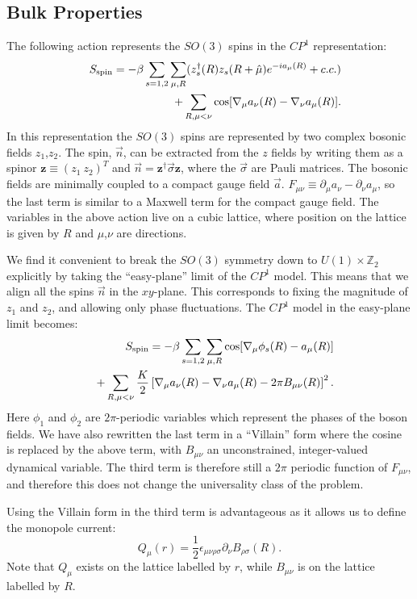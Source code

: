 \documentclass[prb,twocolumn]{revtex4}
\begin{document}
\subsection{Bulk Properties}
The following action represents the $SO(3)$ spins in the $CP^1$ representation:
\begin{eqnarray}
&&S_{\rm spin}=-\beta\sum_{s=1,2}\sum_{\mu,R} (z_s^\dagger(R)z_s(R+\hat\mu)e^{-ia_\mu(R)}+c.c.) \nonumber\\
&&+\sum_{R,\mu<\nu} \cos[\nabla_\mu a_\nu(R)-\nabla_\nu a_\mu(R)].
\end{eqnarray} 
In this representation the $SO(3)$ spins are represented by two complex bosonic fields $z_1$,$z_2$. The spin, $\vec{n}$, can be extracted from the $z$ fields by writing them as a spinor $\mathbf{z}\equiv(z_1~z_2)^T$ and $\vec{n}=\mathbf{z^\dagger} \vec\sigma \mathbf{z}$, where the $\vec{\sigma}$ are Pauli matrices. The bosonic fields are minimally coupled to a compact gauge field $\vec{a}$. $F_{\mu\nu}\equiv \partial_\mu a_\nu-\partial_\nu a_\mu$, so the last term is similar to a Maxwell term for the compact gauge field. The variables in the above action live on a cubic lattice, where position on the lattice is given by $R$ and $\mu$,$\nu$ are directions.

We find it convenient to break the $SO(3)$ symmetry down to $U(1)\times\mathbb{Z}_2$ explicitly by taking the ``easy-plane'' limit of the $CP^1$ model. This means that we align all the spins $\vec{n}$ in the $xy$-plane. This corresponds to fixing the magnitude of $z_1$ and $z_2$, and allowing only phase fluctuations. The $CP^1$ model in the easy-plane limit becomes:
\begin{eqnarray}
&&S_{\rm spin}=-\beta\sum_{s=1,2}\sum_{\mu,R} \cos[\nabla_\mu\phi_s(R)-a_\mu(R)]\nonumber\\
&&+\sum_{R,\mu<\nu}\frac{K}{2}\left[\nabla_\mu a_\nu(R)-\nabla_\nu a_\mu(R)-2\pi B_{\mu\nu}(R)\right]^2.
\label{sspin}
\end{eqnarray}
Here $\phi_1$ and $\phi_2$ are $2\pi$-periodic variables which represent the phases of the boson fields. We have also rewritten the last term in a ``Villain'' form where the cosine is replaced by the above term, with $B_{\mu\nu}$ an unconstrained, integer-valued dynamical variable. The third term is therefore still a $2\pi$ periodic function of $F_{\mu\nu}$, and therefore this does not change the universality class of the problem.

Using the Villain form in the third term is advantageous as it allows us to define the monopole current:
\begin{equation}
Q_\mu(r)=\frac{1}{2}\epsilon_{\mu\nu\rho\sigma}\partial_\nu B_{\rho\sigma}(R).
\end{equation}
Note that $Q_\mu$ exists on the lattice labelled by $r$, while $B_{\mu\nu}$ is on the lattice labelled by $R$.
\end{document}
